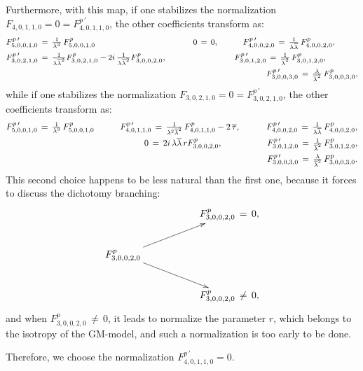\documentclass[12pt,twoside,leqno,openany]{amsart}
\begin{document}
Furthermore, with this map, 
if one stabilizes the normalization $F_{4,0,1,1,0} = 0 = 
F_{4,0,1,1,0}^{p\,\prime}$, 
the other coefficients
transform as:
\[
\footnotesize
\aligned
F_{5,0,0,1,0}^{p\,\prime}
&
\,=\,
\tfrac{1}{\lambda^3}\,
F_{5,0,0,1,0}^p
\ \ \ \ \ \ \ \ \ \ \ \ \ \ \ \ \ \ \ \ \ \ \ \ \ \ \ \ \ \ \ \ \ \ 
\ \   
0
\,=\,
0,
\ \ \ \ \ \ \ \ \ 
F_{4,0,0,2,0}^{p\,\prime}
\,=\,
\tfrac{1}{\lambda\overline{\lambda}}\,
F_{4,0,0,2,0}^p,
\\
F_{3,0,2,1,0}^{p\,\prime}
&
\,=\,
\tfrac{1}{\lambda\overline{\lambda}^2}
F_{3,0,2,1,0}^p
-
2i\,\tfrac{1}{\lambda\overline{\lambda}^2}
F_{3,0,0,2,0}^p,
\ \ \ \ \ \ \ \ \ \ \ \ \ \ \ \ \ \ \ \ \ \ \ \ \ 
F_{3,0,1,2,0}^{p\,\prime}
\,=\,
\tfrac{1}{\overline{\lambda}^2}\,
F_{3,0,1,2,0}^p,
\\
&
\ \ \ \ \ \ \ \ \ \ \ \ \ \ \ \ \ \ \ \ \ \ \ \ \ \ \ \ \ \ \ \ \ \
\ \ \ \ \ \ \ \ \ \ \ \ \ \ \ \ \ \ \ \ \ \ \ \ \ \ \ \ \ \ \ \ \ \
\ \ \ \ \ \ \ \ \ \ \ \ \ \ \ \ 
F_{3,0,0,3,0}^{p\,\prime}
\,=\,
\tfrac{\lambda}{\overline{\lambda}^2}\,
F_{3,0,0,3,0}^p,
\endaligned
\]
while if one stabilizes the normalization $F_{3,0,2,1,0} = 0 = 
F_{3,0,2,1,0}^{p\,\prime}$, the other coefficients
transform as:
\[
\aligned
F_{5,0,0,1,0}^{p\,\prime}
\,=\,
\tfrac{1}{\lambda^3}\,
F_{5,0,0,1,0}^p
\ \ \ \ \ \ \ \ \ 
F_{4,0,1,1,0}^{p\,\prime}
\,=\,
\tfrac{1}{\lambda^2\overline{\lambda}^2}\,
F_{4,0,1,1,0}^p
-
2\,\overline{\tau},
\ \ \ \ \ \ \ \ \
F_{4,0,0,2,0}^{p\,\prime}
\,=\,
\tfrac{1}{\lambda\overline{\lambda}}\,
F_{4,0,0,2,0}^p,
\\
0
\,=\,
2i\,\lambda\overline{\lambda}\,r
F_{3,0,0,2,0}^p,
\ \ \ \ \ \ \ \ \ \ \ \ \ \ \ \, 
F_{3,0,1,2,0}^{p\,\prime}
\,=\,
\tfrac{1}{\overline{\lambda}^2}\,
F_{3,0,1,2,0}^p,
\\
F_{3,0,0,3,0}^{p\,\prime}
\,=\,
\tfrac{\lambda}{\overline{\lambda}^2}\,
F_{3,0,0,3,0}^p.
\endaligned
\]
This second choice happens to be less natural than the first one,
because it forces to discuss the dichotomy branching:
\[
\xymatrix{
&&
F_{3,0,0,2,0}^p\,=\,0,
\\
F_{3,0,0,2,0}^p
\ar[urr]
\ar[drr]
&&
\\
&&
F_{3,0,0,2,0}^p\,\neq\,0,
}
\]
and when $F_{3,0,0,2,0}^p\,\neq\,0$,
it leads to normalize the parameter $r$, which
belongs to the isotropy of the GM-model, 
and such a normalization is too early to be done.

Therefore, we choose the normalization 
$F_{4,0,1,1,0}^{p\,\prime} = 0$.

\smallskip
\end{document}
